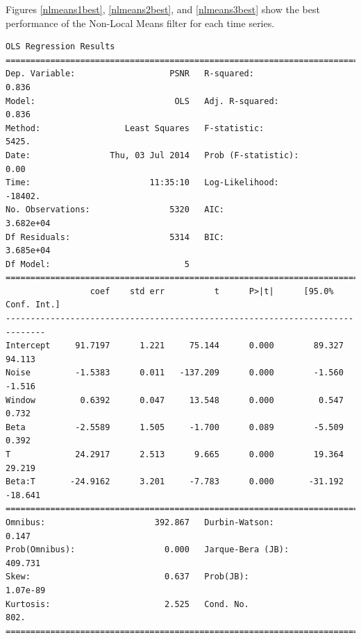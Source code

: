 \documentclass[11pt]{article}
\theoremstyle{definition}
\begin{document}
Figures \ref{nlmeans1best}, \ref{nlmeans2best}, and \ref{nlmeans3best} show the best performance of the Non-Local Means filter for each time series.

{\footnotesize
\begin{lstlisting}[caption = Time Series 1 - Non-Local Means OLS Model, label = {nlmeansfilterseries1}]
                            OLS Regression Results                            
==============================================================================
Dep. Variable:                   PSNR   R-squared:                       0.836
Model:                            OLS   Adj. R-squared:                  0.836
Method:                 Least Squares   F-statistic:                     5425.
Date:                Thu, 03 Jul 2014   Prob (F-statistic):               0.00
Time:                        11:35:10   Log-Likelihood:                -18402.
No. Observations:                5320   AIC:                         3.682e+04
Df Residuals:                    5314   BIC:                         3.685e+04
Df Model:                           5                                         
==============================================================================
                 coef    std err          t      P>|t|      [95.0% Conf. Int.]
------------------------------------------------------------------------------
Intercept     91.7197      1.221     75.144      0.000        89.327    94.113
Noise         -1.5383      0.011   -137.209      0.000        -1.560    -1.516
Window         0.6392      0.047     13.548      0.000         0.547     0.732
Beta          -2.5589      1.505     -1.700      0.089        -5.509     0.392
T             24.2917      2.513      9.665      0.000        19.364    29.219
Beta:T       -24.9162      3.201     -7.783      0.000       -31.192   -18.641
==============================================================================
Omnibus:                      392.867   Durbin-Watson:                   0.147
Prob(Omnibus):                  0.000   Jarque-Bera (JB):              409.731
Skew:                           0.637   Prob(JB):                     1.07e-89
Kurtosis:                       2.525   Cond. No.                         802.
==============================================================================
\end{lstlisting}

}
\end{document}
